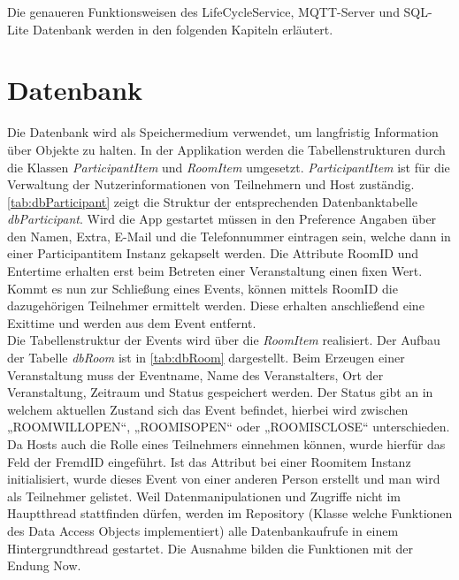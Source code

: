 Die genaueren Funktionsweisen des LifeCycleService, MQTT-Server und SQL-Lite Datenbank werden in den folgenden Kapiteln erläutert.


\section{Datenbank}
\label{sec:Datenbank}
Die Datenbank wird als Speichermedium verwendet, um langfristig Information über Objekte zu halten. 
In der Applikation werden die Tabellenstrukturen durch die Klassen \textit{ParticipantItem} und \textit{RoomItem} umgesetzt. 
\textit{ParticipantItem} ist für die Verwaltung der Nutzerinformationen von Teilnehmern und Host zuständig.\\
 \cref{tab:dbParticipant} zeigt die Struktur der entsprechenden Datenbanktabelle \textit{dbParticipant}.
 Wird die App gestartet müssen in den Preference Angaben über den Namen, Extra, E-Mail und die Telefonnummer eintragen sein, welche dann in einer Participantitem Instanz gekapselt werden. 
Die Attribute RoomID 
 und Entertime erhalten erst beim Betreten einer Veranstaltung einen fixen Wert. Kommt es nun zur Schließung eines Events, können mittels RoomID die dazugehörigen Teilnehmer ermittelt werden. 
Diese erhalten anschließend eine Exittime und werden aus dem Event entfernt. \\
Die Tabellenstruktur der Events wird über die \textit{RoomItem} realisiert. Der Aufbau der Tabelle \textit{dbRoom} ist in \cref{tab:dbRoom} dargestellt. 
Beim Erzeugen einer Veranstaltung muss der Eventname, Name des Veranstalters, Ort der Veranstaltung, Zeitraum und Status gespeichert werden. 
Der Status gibt an in welchem aktuellen Zustand sich das Event befindet, hierbei wird zwischen „ROOMWILLOPEN“, „ROOMISOPEN“ oder „ROOMISCLOSE“ unterschieden.
Da Hosts auch die Rolle eines Teilnehmers einnehmen können, wurde hierfür das Feld der FremdID eingeführt. 
Ist das Attribut bei einer Roomitem Instanz initialisiert, wurde dieses Event von einer anderen Person erstellt und man wird als Teilnehmer gelistet.
Weil Datenmanipulationen und Zugriffe nicht im Hauptthread stattfinden dürfen, werden im Repository (Klasse welche Funktionen des Data Access Objects implementiert) alle Datenbankaufrufe in einem Hintergrundthread gestartet.
Die Ausnahme bilden die Funktionen mit der Endung Now. 
